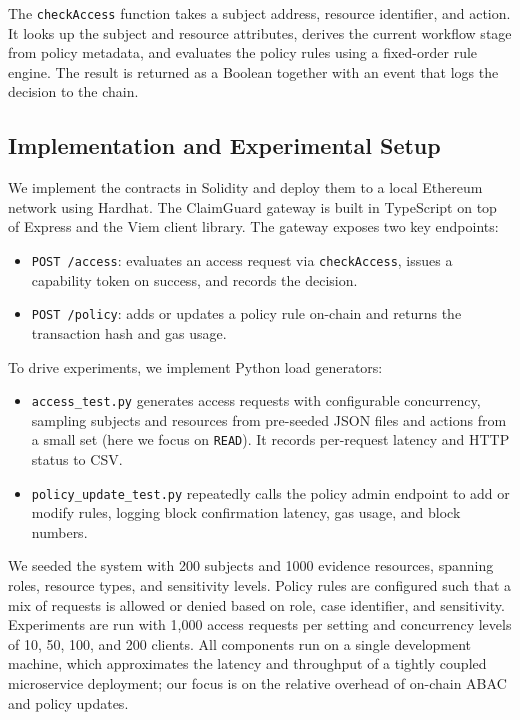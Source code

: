 \documentclass[conference]{IEEEtran}
\begin{document}
The \texttt{checkAccess} function takes a subject address, resource identifier, and action. 
It looks up the subject and resource attributes, derives the current workflow stage from policy metadata, and evaluates the policy rules using a fixed-order rule engine.
The result is returned as a Boolean together with an event that logs the decision to the chain.

\subsection{Implementation and Experimental Setup}

We implement the contracts in Solidity and deploy them to a local Ethereum network using Hardhat. 
The ClaimGuard gateway is built in TypeScript on top of Express and the Viem client library. 
The gateway exposes two key endpoints:
\begin{itemize}
    \item \texttt{POST /access}: evaluates an access request via \texttt{checkAccess}, issues a capability token on success, and records the decision.
    \item \texttt{POST /policy}: adds or updates a policy rule on-chain and returns the transaction hash and gas usage.
\end{itemize}
To drive experiments, we implement Python load generators:
\begin{itemize}
    \item \texttt{access\_test.py} generates access requests with configurable concurrency, sampling subjects and resources from pre-seeded JSON files and actions from a small set (here we focus on \texttt{READ}). 
          It records per-request latency and HTTP status to CSV.
    \item \texttt{policy\_update\_test.py} repeatedly calls the policy admin endpoint to add or modify rules, logging block confirmation latency, gas usage, and block numbers.
\end{itemize}

We seeded the system with 200 subjects and 1000 evidence resources, spanning roles, resource types, and sensitivity levels. Policy rules are configured such that a mix of requests is allowed or denied based on role, case identifier, and sensitivity. 
Experiments are run with 1{,}000 access requests per setting and concurrency levels of 10, 50, 100, and 200 clients. All components run on a single development machine, which approximates the latency and throughput of a tightly coupled microservice deployment; our focus is on the relative overhead of on-chain ABAC and policy updates.
\end{document}
